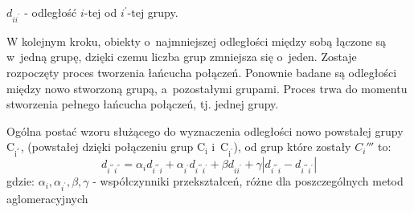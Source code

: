 \documentclass[12pt,a4paper]{report}
\begin{document}
$d_{ii^{'}}$ - odległość $i$-tej od $i^{'}$-tej grupy.

W kolejnym kroku, obiekty o~najmniejszej odległości między sobą łączone są w~jedną grupę, dzięki czemu liczba grup zmniejsza się o~jeden. Zostaje rozpoczęty proces tworzenia łańcucha połączeń. Ponownie badane są odległości między nowo stworzoną grupą, a~pozostałymi grupami. Proces trwa do momentu stworzenia pełnego łańcucha połączeń, tj. jednej grupy. 


Ogólna postać wzoru służącego do wyznaczenia odległości nowo powstałej grupy $\mathrm{C_{i^{''}}}$, (powstałej dzięki połączeniu grup $\mathrm{C_{i}}$ i~$\mathrm{C_{i^{'}}}$), od grup które zostały ${C_i{'''}}$ to:
$$
d_{i^{'''}i^{''}}=\alpha_{i}d_{i^{'''}i} + \alpha_{i^{'}}d_{i^{'''}i^{'}} + \beta d_{ii^{'}} + \gamma|d_{i^{'''}i} - d_{i^{'''}i^{'}}| 
$$
gdzie:
$\alpha_{i},\alpha_{i^{'}}, \beta, \gamma$ - współczynniki przekształceń, różne dla poszczególnych metod aglomeracyjnych
\end{document}
